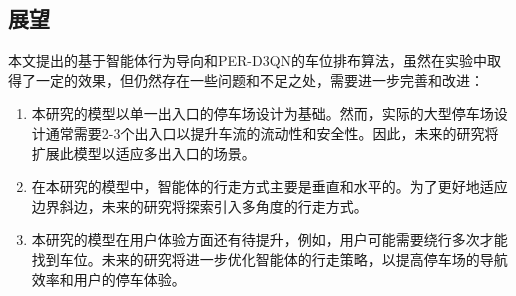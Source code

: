 \subsection{展望}
本文提出的基于智能体行为导向和PER-D3QN的车位排布算法，虽然在实验中取得了一定的效果，但仍然存在一些问题和不足之处，需要进一步完善和改进：
\begin{enumerate}
    \item 本研究的模型以单一出入口的停车场设计为基础。然而，实际的大型停车场设计通常需要2-3个出入口以提升车流的流动性和安全性。因此，未来的研究将扩展此模型以适应多出入口的场景。
    \item 在本研究的模型中，智能体的行走方式主要是垂直和水平的。为了更好地适应边界斜边，未来的研究将探索引入多角度的行走方式。
    \item 本研究的模型在用户体验方面还有待提升，例如，用户可能需要绕行多次才能找到车位。未来的研究将进一步优化智能体的行走策略，以提高停车场的导航效率和用户的停车体验。
\end{enumerate}